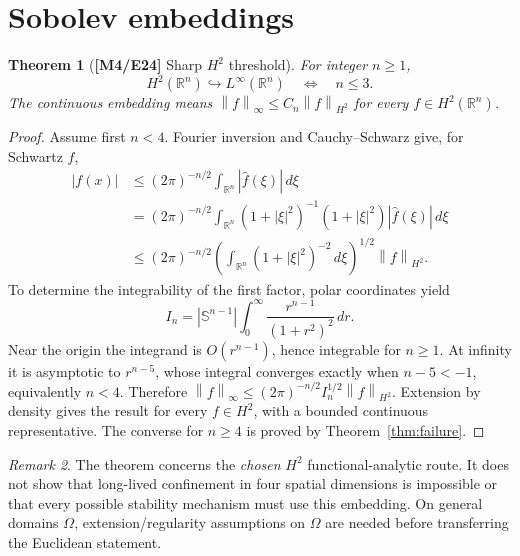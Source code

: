 \documentclass[11pt,letterpaper]{article}
\newtheorem{theorem}{Theorem}[section]
\theoremstyle{definition}
\theoremstyle{remark}
\newtheorem{remark}[theorem]{Remark}
\newcommand{\R}{\mathbb R}
\newcommand{\norm}[1]{\left\lVert#1\right\rVert}
\newcommand{\abs}[1]{\left\lvert#1\right\rvert}
\newcommand{\id}[1]{\textnormal{\textbf{[#1]}}}
\begin{document}
\section{Sobolev embeddings}
\begin{theorem}[\id{M4/E24} Sharp $H^2$ threshold]\label{thm:sobolev}
For integer $n\ge1$,
\begin{equation}\label{eq:threshold}
H^2(\R^n)\hookrightarrow L^\infty(\R^n)
\quad\Longleftrightarrow\quad n\le3.
\end{equation}
The continuous embedding means $\norm f_\infty\le C_n\norm f_{H^2}$
for every $f\in H^2(\R^n)$.
\end{theorem}
\begin{proof}
Assume first $n<4$. Fourier inversion and Cauchy--Schwarz give,
for Schwartz $f$,
\begin{align*}
\abs{f(x)}
&\le(2\pi)^{-n/2}\int_{\R^n}\abs{\widehat f(\xi)}\,d\xi\\
&=(2\pi)^{-n/2}\int_{\R^n}(1+\abs\xi^2)^{-1}
(1+\abs\xi^2)\abs{\widehat f(\xi)}\,d\xi\\
&\le (2\pi)^{-n/2}\left(\int_{\R^n}(1+\abs\xi^2)^{-2}\,d\xi\right)^{1/2}
\norm f_{H^2}.
\end{align*}
To determine the integrability of the first factor, polar coordinates yield
\begin{equation*}
I_n=\abs{\mathbb S^{n-1}}\int_0^\infty
\frac{r^{n-1}}{(1+r^2)^2}\,dr.
\end{equation*}
Near the origin the integrand is $O(r^{n-1})$, hence integrable for
$n\ge1$. At infinity it is asymptotic to $r^{n-5}$, whose integral
converges exactly when $n-5<-1$, equivalently $n<4$.
Therefore $\norm f_\infty\le(2\pi)^{-n/2}I_n^{1/2}\norm f_{H^2}$.
Extension by density gives the result for every $f\in H^2$, with a
bounded continuous representative. The converse for $n\ge4$ is proved
by Theorem~\ref{thm:failure}.
\end{proof}
\begin{remark}
The theorem concerns the \emph{chosen} $H^2$ functional-analytic route.
It does not show that long-lived confinement in four spatial dimensions is
impossible or that every possible stability mechanism must use this embedding.
On general domains $\Omega$, extension/regularity assumptions on $\Omega$
are needed before transferring the Euclidean statement.
\end{remark}
\end{document}
